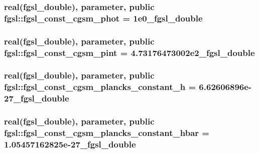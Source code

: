 \subsubsection[{fgsl\+\_\+const\+\_\+cgsm\+\_\+phot}]{\setlength{\rightskip}{0pt plus 5cm}real({\bf fgsl\+\_\+double}), parameter, public fgsl\+::fgsl\+\_\+const\+\_\+cgsm\+\_\+phot = 1e0\+\_\+fgsl\+\_\+double}\label{namespacefgsl_a97e19ca0cdcef10fb78328e155bc5671}
\hypertarget{namespacefgsl_a77fc850550f8adbaa35a17890fe1ddb6}{}
\subsubsection[{fgsl\+\_\+const\+\_\+cgsm\+\_\+pint}]{\setlength{\rightskip}{0pt plus 5cm}real({\bf fgsl\+\_\+double}), parameter, public fgsl\+::fgsl\+\_\+const\+\_\+cgsm\+\_\+pint = 4.\+73176473002e2\+\_\+fgsl\+\_\+double}\label{namespacefgsl_a77fc850550f8adbaa35a17890fe1ddb6}
\hypertarget{namespacefgsl_ace25c1aaa228a6b88d1f8e8ad1811cc5}{}
\subsubsection[{fgsl\+\_\+const\+\_\+cgsm\+\_\+plancks\+\_\+constant\+\_\+h}]{\setlength{\rightskip}{0pt plus 5cm}real({\bf fgsl\+\_\+double}), parameter, public fgsl\+::fgsl\+\_\+const\+\_\+cgsm\+\_\+plancks\+\_\+constant\+\_\+h = 6.\+62606896e-\/27\+\_\+fgsl\+\_\+double}\label{namespacefgsl_ace25c1aaa228a6b88d1f8e8ad1811cc5}
\hypertarget{namespacefgsl_a59a3499a4c13d0d58c0aa1470c6c589a}{}
\subsubsection[{fgsl\+\_\+const\+\_\+cgsm\+\_\+plancks\+\_\+constant\+\_\+hbar}]{\setlength{\rightskip}{0pt plus 5cm}real({\bf fgsl\+\_\+double}), parameter, public fgsl\+::fgsl\+\_\+const\+\_\+cgsm\+\_\+plancks\+\_\+constant\+\_\+hbar = 1.\+05457162825e-\/27\+\_\+fgsl\+\_\+double}\label{namespacefgsl_a59a3499a4c13d0d58c0aa1470c6c589a}
\hypertarget{namespacefgsl_a924bd137c2b9e9abffbc4edb9826b398}{}

